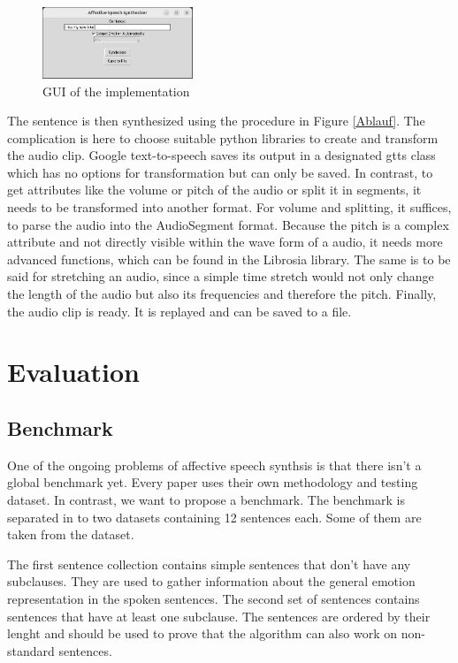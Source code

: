 \documentclass[11pt]{article}
\begin{document}
\begin{figure}[h]
 \centering
\includegraphics[width=0.4\textwidth]{"Bilder/GUI.png"}
\caption{GUI of the implementation}
\end{figure}

The sentence is then synthesized using the procedure in Figure \ref{Ablauf}. The complication is here to choose suitable python libraries to create and transform the audio clip. Google text-to-speech saves its output in a designated gtts class which has no options for transformation but can only be saved. In contrast, to get attributes like the volume or pitch of the audio or split it in segments, it needs to be transformed into another format. For volume and splitting, it suffices, to parse the audio into the AudioSegment format. Because the pitch is a complex attribute and not directly visible within the wave form of a audio, it needs more advanced functions, which can be found in the Librosia library. The same is to be said for stretching an audio, since a simple time stretch would not only change the length of the audio but also its frequencies and therefore the pitch.
Finally, the audio clip is ready. It is replayed and can be saved to a file.

\section{Evaluation}
\label{evaluation}

\subsection{Benchmark}
One of the ongoing problems of affective speech synthsis is that there isn't a global benchmark yet\cite{triantafyllopoulos_overview_2023}. Every paper uses their own methodology and testing dataset. In contrast, we want to propose a benchmark. The benchmark is separated in to two datasets containing 12 sentences each. Some of them are taken from the \cite{saravia-etal-2018-carer} dataset.

The first sentence collection contains simple sentences that don't have any subclauses. They are used to gather information about the general emotion representation in the spoken sentences. The second set of sentences contains sentences that have at least one subclause. The sentences are ordered by their lenght and should be used to prove that the algorithm can also work on non-standard sentences.
\end{document}
